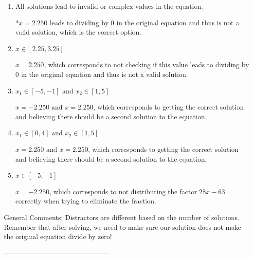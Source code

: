 \documentclass{extbook}[14pt]
\begin{document}
\begin{enumerate}[label=\Alph*.] 
\item $ \text{All solutions lead to invalid or complex values in the equation.} $ 

 *$x = 2.250$ leads to dividing by 0 in the original equation and thus is not a valid solution, which is the correct option. 
\item $ x \in [2.25,3.25] $ 

 $x = 2.250$, which corresponds to not checking if this value leads to dividing by 0 in the original equation and thus is not a valid solution. 
\item $ x_1 \in [-5, -1] \text{ and } x_2 \in [1,5] $ 

 $x = -2.250 \text{ and } x = 2.250$, which corresponds to getting the correct solution and believing there should be a second solution to the equation. 
\item $ x_1 \in [0, 4] \text{ and } x_2 \in [1,5] $ 

 $x = 2.250 \text{ and } x = 2.250$, which corresponds to getting the correct solution and believing there should be a second solution to the equation. 
\item $ x \in [-5,-1] $ 

 $x = -2.250$, which corresponds to not distributing the factor $28x -63$ correctly when trying to eliminate the fraction. 
\end{enumerate} 
 
General Comments: Distractors are different based on the number of solutions. Remember that after solving, we need to make sure our solution does not make the original equation divide by zero!

-----------------------------------------------
\end{document}
